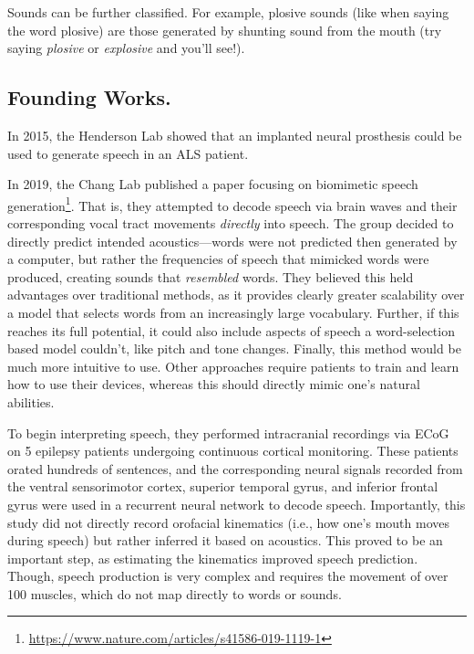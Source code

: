 Sounds can be further classified. For example, plosive sounds (like when saying the word plosive) are those generated by shunting sound from the mouth (try saying \textit{plosive} or \textit{explosive} and you'll see!). \newline


\subsection{Founding Works.}

In 2015, the Henderson Lab showed that an implanted neural prosthesis could be used to generate speech in an ALS patient. \newline

In 2019, the Chang Lab published a paper focusing on biomimetic speech generation\footnote{\url{https://www.nature.com/articles/s41586-019-1119-1}}. That is, they attempted to decode speech via brain waves and their corresponding vocal tract movements \textit{directly} into speech. The group decided to directly predict intended acoustics---words were not predicted then generated by a computer, but rather the frequencies of speech that mimicked words were produced, creating sounds that \textit{resembled} words. They believed this held advantages over traditional methods, as it provides clearly greater scalability over a model that selects words from an increasingly large vocabulary. Further, if this reaches its full potential, it could also include aspects of speech a word-selection based model couldn't, like pitch and tone changes. Finally, this method would be much more intuitive to use. Other approaches require patients to train and learn how to use their devices, whereas this should directly mimic one's natural abilities. \newline

To begin interpreting speech, they performed intracranial recordings via ECoG on 5 epilepsy patients undergoing continuous cortical monitoring. These patients orated hundreds of sentences, and the corresponding neural signals recorded from the ventral sensorimotor cortex, superior temporal gyrus, and inferior frontal gyrus were used in a recurrent neural network to decode speech. Importantly, this study did not directly record orofacial kinematics (i.e., how one's mouth moves during speech) but rather inferred it based on acoustics. This proved to be an important step, as estimating the kinematics improved speech prediction. Though, speech production is very complex and requires the movement of over 100 muscles, which do not map directly to words or sounds. \newline

